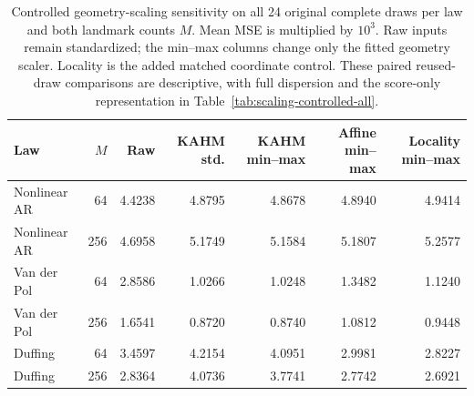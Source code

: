 \begin{table}[t]
\centering
\scriptsize
\begin{tabular}{lrrrrrr}
\toprule
Law & $M$ & Raw & KAHM std. & KAHM min--max & Affine min--max & Locality min--max \\
\midrule
Nonlinear AR & 64 & 4.4238 & 4.8795 & 4.8678 & 4.8940 & 4.9414 \\
Nonlinear AR & 256 & 4.6958 & 5.1749 & 5.1584 & 5.1807 & 5.2577 \\
Van der Pol & 64 & 2.8586 & 1.0266 & 1.0248 & 1.3482 & 1.1240 \\
Van der Pol & 256 & 1.6541 & 0.8720 & 0.8740 & 1.0812 & 0.9448 \\
Duffing & 64 & 3.4597 & 4.2154 & 4.0951 & 2.9981 & 2.8227 \\
Duffing & 256 & 2.8364 & 4.0736 & 3.7741 & 2.7742 & 2.6921 \\
\bottomrule
\end{tabular}
\caption{Controlled geometry-scaling sensitivity on all 24 original complete draws per law and both landmark counts $M$. Mean MSE is multiplied by $10^3$. Raw inputs remain standardized; the min--max columns change only the fitted geometry scaler. Locality is the added matched coordinate control. These paired reused-draw comparisons are descriptive, with full dispersion and the score-only representation in Table~\ref{tab:scaling-controlled-all}.}
\label{tab:scaling-controlled}
\end{table}
